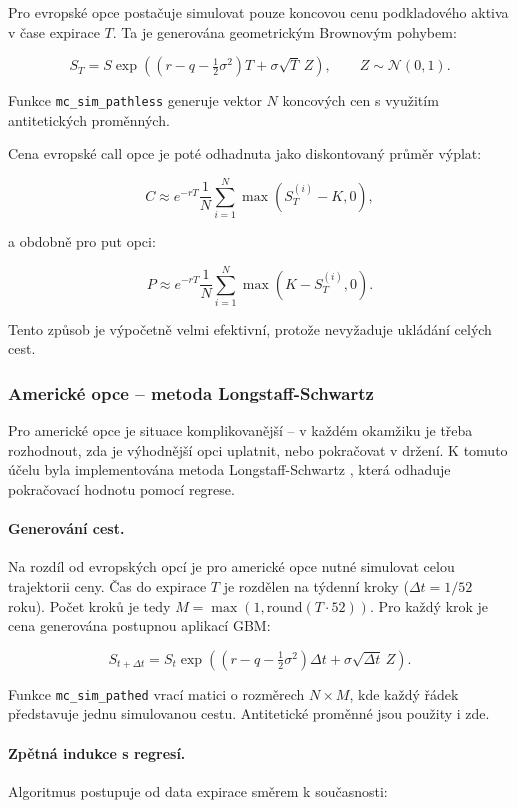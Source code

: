 Pro evropské opce postačuje simulovat pouze koncovou cenu podkladového aktiva v čase expirace \(T\). Ta je generována geometrickým Brownovým pohybem:

\[
S_T = S \exp\!\left( (r - q - \tfrac{1}{2}\sigma^2)T + \sigma\sqrt{T}\,Z \right), \qquad Z \sim \mathcal{N}(0,1).
\]

Funkce \texttt{mc\_sim\_pathless} generuje vektor \(N\) koncových cen s využitím antitetických proměnných.

Cena evropské call opce je poté odhadnuta jako diskontovaný průměr výplat:

\[
C \approx e^{-rT} \frac{1}{N} \sum_{i=1}^{N} \max(S_T^{(i)} - K, 0),
\]

a obdobně pro put opci:

\[
P \approx e^{-rT} \frac{1}{N} \sum_{i=1}^{N} \max(K - S_T^{(i)}, 0).
\]

Tento způsob je výpočetně velmi efektivní, protože nevyžaduje ukládání celých cest.

\subsubsection{Americké opce – metoda Longstaff-Schwartz}

Pro americké opce je situace komplikovanější – v každém okamžiku je třeba rozhodnout, zda je výhodnější opci uplatnit, nebo pokračovat v držení. K tomuto účelu byla implementována metoda Longstaff-Schwartz \citep{LongstaffSchwartz2001}, která odhaduje pokračovací hodnotu pomocí regrese.

\paragraph{Generování cest.} Na rozdíl od evropských opcí je pro americké opce nutné simulovat celou trajektorii ceny. Čas do expirace \(T\) je rozdělen na týdenní kroky (\(\Delta t = 1/52\) roku). Počet kroků je tedy \(M = \max(1, \text{round}(T \cdot 52))\). Pro každý krok je cena generována postupnou aplikací GBM:

\[
S_{t+\Delta t} = S_t \exp\!\left( (r - q - \tfrac{1}{2}\sigma^2)\Delta t + \sigma\sqrt{\Delta t}\,Z \right).
\]

Funkce \texttt{mc\_sim\_pathed} vrací matici o rozměrech \(N \times M\), kde každý řádek představuje jednu simulovanou cestu. Antitetické proměnné jsou použity i zde.

\paragraph{Zpětná indukce s regresí.} Algoritmus postupuje od data expirace směrem k současnosti:


